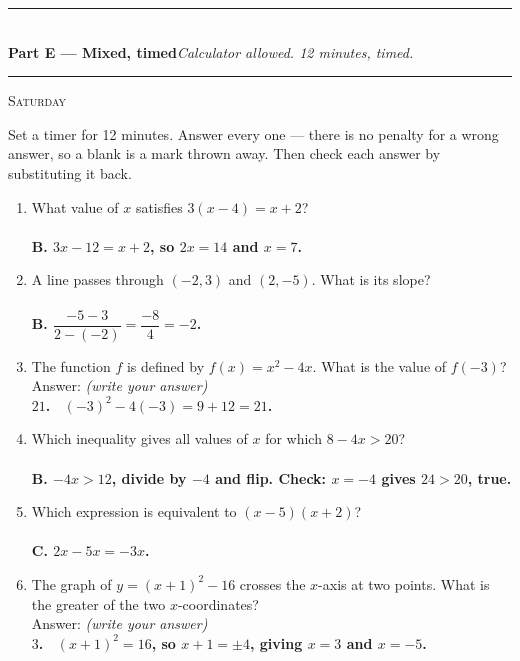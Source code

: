 \documentclass[11pt,a4paper]{article}
\newcommand{\PartHead}[2]{%
  \vspace{6pt}
  {\color{navy}\rule{\textwidth}{0.8pt}}\\[2pt]
  {\large\bfseries\color{navy}#1}\hfill{\small\itshape #2}\\[-4pt]
  {\color{navy}\rule{\textwidth}{0.4pt}}
  \vspace{4pt}
}
\newcommand{\sitting}[1]{{\footnotesize\textsc{\color{navy}#1}}\par\vspace{2pt}}
\newcommand{\spr}{\\[3pt]\hspace*{6pt}Answer: \underline{\hspace{3.2cm}}\hfill{\footnotesize\itshape(write your answer)}}
\newcommand{\ans}[1]{\ {\color{keyred}\bfseries #1}}
\newcommand{\ans}[1]{}
\begin{document}
\PartHead{Part E --- Mixed, timed}{Calculator allowed. 12 minutes, timed.}
\sitting{Saturday}
Set a timer for 12 minutes. Answer every one --- there is no penalty for a wrong answer,
so a blank is a mark thrown away. Then check each answer by substituting it back.

\begin{enumerate}[leftmargin=20pt,itemsep=8pt]
\item What value of $x$ satisfies $3(x-4)=x+2$?\\
  \ans{\\ B. $3x-12=x+2$, so $2x=14$ and $x=7$.}

\item A line passes through $(-2,3)$ and $(2,-5)$. What is its slope?\\
  \ans{\\ B. $\dfrac{-5-3}{2-(-2)}=\dfrac{-8}{4}=-2$.}

\item The function $f$ is defined by $f(x)=x^2-4x$. What is the value of $f(-3)$? \spr
  \ans{\\ $21$. \ $(-3)^2-4(-3)=9+12=21$.}

\item Which inequality gives all values of $x$ for which $8-4x>20$?\\
  \ans{\\ B. $-4x>12$, divide by $-4$ and flip. Check: $x=-4$ gives $24>20$, true.}

\item Which expression is equivalent to $(x-5)(x+2)$?\\
  \ans{\\ C. $2x-5x=-3x$.}

\item The graph of $y=(x+1)^2-16$ crosses the $x$-axis at two points.
  What is the greater of the two $x$-coordinates? \spr
  \ans{\\ $3$. \ $(x+1)^2=16$, so $x+1=\pm4$, giving $x=3$ and $x=-5$.}
\end{enumerate}
\end{document}
